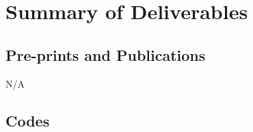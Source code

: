 \documentclass[11pt]{article}
\newcommand{\db}[1]{{\color{dark_blue}{#1}}}
\newcommand{\bb}[1]{{\textbf{\db{#1}}}}
\newcommand{\jv}[1]{{\color{red}{\it [JV: #1]}}}
\newcommand{\para}[1]{\vspace{5pt}\noindent{\bb{\bf  #1:}}}
\begin{document}






\clearpage
\appendix
\section{Summary of Deliverables}


\subsection{Pre-prints and Publications}

% 
% 
% 




N/A


\subsection{Codes}
\end{document}
